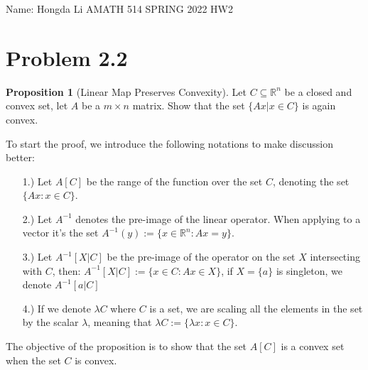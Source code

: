 \documentclass[]{article}
\theoremstyle{definition}
\newtheorem{prop}{Proposition}
\begin{document}
\begin{center}
    Name: Hongda Li \quad AMATH 514 SPRING 2022 HW2
\end{center}
\section{Problem 2.2}
    \begin{prop}[Linear Map Preserves Convexity]
        Let $C \subseteq \mathbb R^n$ be a closed and convex set, let $A$ be a $m\times n$ matrix. Show that the set $\{Ax| x\in C\}$ is again convex. 
    \end{prop}
    \noindent
    To start the proof, we introduce the following notations to make discussion better: 
    \begin{enumerate}
        \item [1.)] Let $A[C]$ be the range of the function over the set $C$, denoting the set $\{Ax: x\in C\}$. 
        \item [2.)] Let $A^{-1}$ denotes the pre-image of the linear operator. When applying to a vector it's the set $A^{-1}(y) := \{x\in \mathbb R^n: Ax = y\}$. 
        \item [3.)] Let $A^{-1}[X|C]$ be the pre-image of the operator on the set $X$ intersecting with $C$, then: $A^{-1}[X|C]:= \{x\in C: Ax\in X\}$, if $X = \{a\}$ is singleton, we denote $A^{-1}[a|C]$
        \item [4.)] If we denote $\lambda C$ where $C$ is a set, we are scaling all the elements in the set by the scalar $\lambda$, meaning that $\lambda C:= \{\lambda x: x \in C\}$. 
    \end{enumerate}
    The objective of the proposition is to show that the set $A[C]$ is a convex set when the set $C$ is convex. 
\end{document}
